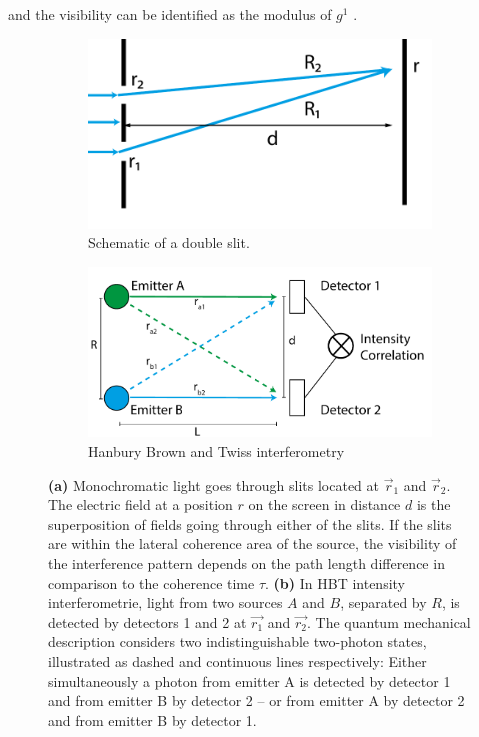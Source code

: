 and the visibility can be identified as the modulus of $g^1$ \cite{loudon2000,ou2017}. 
\begin{figure}
	\centering
	\begin{subfigure}[b]{0.4\textwidth}
	\includegraphics[width=\linewidth]{images/doubleslit.pdf}
	\caption[Schematic of a lit]{Schematic of a double slit.}
	\label{fig:doubleslit}
	\end{subfigure}
\begin{subfigure}[b]{0.5\textwidth}
	\includegraphics[width=\linewidth]{images/correlation.pdf}
	\caption{Hanbury Brown and Twiss interferometry}
	\label{fig:twophoton}
\end{subfigure}
\caption[Schematic of a double slit and two-photon interference in  HBT interferometrie]{\textbf{(a)} Monochromatic light goes through slits located at $\vec{r}_1$ and $
	\vec{r}_2$. The electric field at a position $r$ on the screen in distance $d$ is the superposition of fields going through either of the slits.  If the slits are within the lateral coherence area of the source, the visibility of the interference pattern depends on the path length difference in comparison to the coherence time $\tau$. \textbf{(b)}
In HBT intensity interferometrie, light from two sources $A$ and $B$, separated by $R$, is detected by detectors 1 and 2 at $\vec{r_1}$ and $\vec{r_2}$. The quantum mechanical description considers two indistinguishable two-photon states, illustrated as dashed and  continuous lines respectively: Either simultaneously a photon from emitter A is detected by detector 1 and from emitter B by detector 2 --  or from emitter A by detector 2 and from emitter B by detector 1.}
\end{figure}



